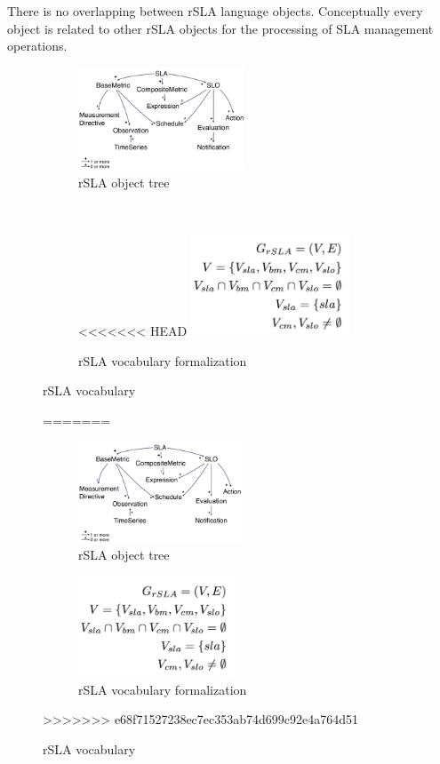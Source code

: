 There is no overlapping between rSLA language objects. Conceptually every object is related to other rSLA objects for the processing of SLA management operations. 

\begin{figure}
    \centering
    \begin{subfigure}
        \centering
        \includegraphics[height=1.2in]{pics/rslaobject}
        \caption{rSLA object tree}
    \end{subfigure}%
    ~ 
    \begin{subfigure}
        \centering
<<<<<<< HEAD
        \includegraphics[height=1.2in]{pics/rslagraph}
        \caption{rSLA vocabulary formalization}
    \end{subfigure}
    \caption{rSLA vocabulary}
=======
        \begin{subfigure}[h]{0.5\textwidth}
                \includegraphics[height=3cm]{pics/rslaobject}
                \caption{rSLA object tree}
                \label{rslaobject}
        \end{subfigure}%
        \begin{subfigure}[h]{0.5\textwidth}
               \includegraphics[height=3cm]{pics/rslagraph}
                \caption{rSLA vocabulary formalization}
                \label{rslagraph}
        \end{subfigure}
        \caption{rSLA vocabulary}\label{treegraph}
>>>>>>> e68f71527238ec7ec353ab74d699c92e4a764d51
\end{figure}

